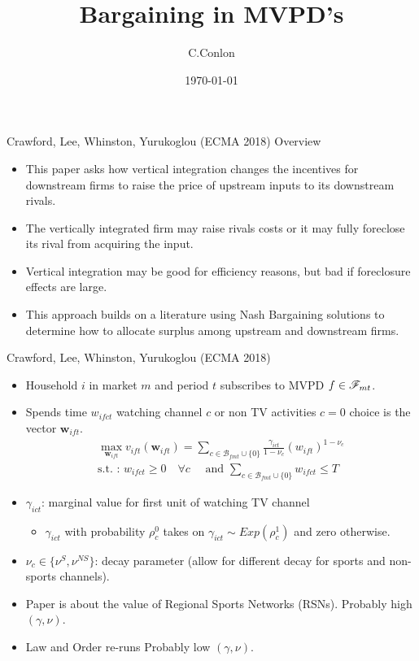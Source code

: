 \documentclass[aspectratio=169,11pt]{beamer}
\title [CLWY]{Bargaining in MVPD's}
\author{C.Conlon}
\institute{Grad IO}
\date{\today}
\begin{document}
\begin{frame}
\titlepage
\end{frame}




\begin{frame}{Crawford, Lee, Whinston, Yurukoglou (ECMA 2018)}
Overview
\begin{itemize}
\item This paper asks how vertical integration changes the incentives for \alert{downstream firms} to raise the price of upstream inputs to its downstream rivals.
\item The vertically integrated firm may \alert{raise rivals costs} or it may fully \alert{foreclose} its rival from acquiring the input.
\item Vertical integration may be good for efficiency reasons, but bad if foreclosure effects are large.
\item This approach builds on a literature using \alert{Nash Bargaining} solutions to determine how to allocate surplus among upstream and downstream firms.
\end{itemize}
\end{frame}

\begin{frame}{Crawford, Lee, Whinston, Yurukoglou (ECMA 2018)}
\begin{itemize}
\item Household $i$ in market $m$ and period $t$ subscribes to MVPD $f \in \mathscr{F}_{mt}$.
\item Spends time $w_{ifct}$ watching channel $c$ or non TV activities $c=0$ choice is the vector $\symbf{w}_{ift}$.
\begin{eqnarray*}
\max_{\symbf{w}_{ift}} v_{ift}(\symbf{w}_{ift}) =  \sum_{c \in \mathcal{B}_{fmt} \cup \{0\}}  \frac{\gamma_{ict}}{1-\nu_c}(w_{ift})^{1-\nu_c}\\
\mbox{s.t. : } w_{ifct} \geq 0\quad  \forall c \quad \mbox{ and } \sum_{c \in \mathcal{B}_{fmt} \cup \{0\}} w_{ifct} \leq T
\end{eqnarray*}
\item $\gamma_{ict}$: marginal value for first unit of watching TV channel
\begin{itemize}
\item $\gamma_{ict}$ with probability $\rho_c^0$ takes on $\gamma_{ict} \sim Exp(\rho_c^1)$ and zero otherwise.
\end{itemize}
\item $\nu_c \in \{\nu^{S},\nu^{NS}\}$: decay parameter (allow for different decay for sports and non-sports channels).
\item Paper is about the value of \alert{Regional Sports Networks} (RSNs). Probably high $(\gamma,\nu)$.
\item Law and Order re-runs Probably low $(\gamma,\nu)$.
\end{itemize}
\end{frame}
\end{document}
